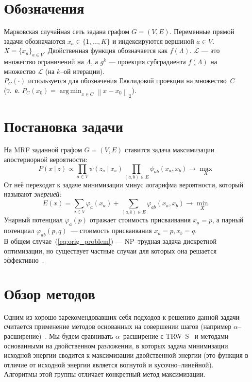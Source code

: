 \documentclass{article}
\DeclareMathOperator*{\argmin}{arg\,min}
\begin{document}
\section{Обозначения}
Марковская случайная сеть задана графом $G = (V, E)$. Переменные прямой задачи обозначаются $x_a \in \{1, \dots, K\}$ и индексируются вершиной $a \in V$. $X = \{x_a\}_{a \in V}$. Двойственная функция обозначается как $f(\Lambda)$. $\mathcal{L}$ --- это множество ограничений на $\Lambda$, а $g^k$ --- проекция субградиента $f(\Lambda)$ на множество $\mathcal{L}$ (на $k$--ой итерации).\\
$P_C(\cdot)$ используется для обозначения Евклидовой проекции на множество~$C$ (т.~е. $P_C(x_0) = \argmin_{x \in C} \left \| x - x_0 \right \|_2$).

\section{Постановка задачи}
На MRF заданной графом $G = (V, E)$ ставится задача максимизации апостериорной вероятности:
\begin{equation*}
    P(x~|~z) \propto \prod_{a \in V} \psi (z_a~|~x_a) \prod_{(a,b) \in E} \psi_{ab} (x_{a}, x_{b}) \rightarrow \max_{X}
\end{equation*}
От неё переходят к задаче минимизации минус логарифма вероятности, который называют \textit{энергией}:
\begin{equation}
    E(x) = \sum_{a \in V} \varphi_a (x_a) + \sum_{(a,b) \in E} \varphi_{ab} (x_{a}, x_{b}) \rightarrow \min_{X}
    \label{eq:orig_problem}
\end{equation}
Унарный потенциал $\varphi_a (p)$ отражает стоимость присваивания $x_a = p$, а парный потенциал $\varphi_{ab} (p, q)$~--- стоимость присваивания $x_{a} = p, x_{b} = q$.\\
В общем случае~(\ref{eq:orig_problem}) --- NP--трудная задача дискретной оптимизации, но существует частные случаи для которых она решается эффективно~\cite{belief_propagation}.

\section{Обзор методов}
Одним из хорошо зарекомендовавших себя подходов к решению данной задачи считается применение методов основанных на совершении шагов (например $\alpha$--расширение)~\cite{NewComparison}.
Мы будем сравнивать $\alpha$--расширение с TRW--S~\cite{TRWS} и методами основанными на
двойственном разложении, в которых задача минимизации
исходной энергии сводится к максимизации
двойственной энергии (это функция в отличие от исходной энергии
является вогнутой и кусочно--линейной).
Алгоритмы этой группы отличает конкретный метод максимизации.
\end{document}

